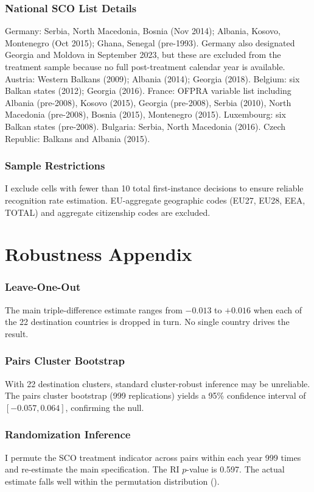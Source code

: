 \documentclass[12pt]{article}
\begin{document}
\subsubsection*{National SCO List Details} Germany: Serbia, North Macedonia, Bosnia (Nov 2014); Albania, Kosovo, Montenegro (Oct 2015); Ghana, Senegal (pre-1993). Germany also designated Georgia and Moldova in September 2023, but these are excluded from the treatment sample because no full post-treatment calendar year is available. Austria: Western Balkans (2009); Albania (2014); Georgia (2018). Belgium: six Balkan states (2012); Georgia (2016). France: OFPRA variable list including Albania (pre-2008), Kosovo (2015), Georgia (pre-2008), Serbia (2010), North Macedonia (pre-2008), Bosnia (2015), Montenegro (2015). Luxembourg: six Balkan states (pre-2008). Bulgaria: Serbia, North Macedonia (2016). Czech Republic: Balkans and Albania (2015).

\subsubsection*{Sample Restrictions} I exclude cells with fewer than 10 total first-instance decisions to ensure reliable recognition rate estimation. EU-aggregate geographic codes (EU27, EU28, EEA, TOTAL) and aggregate citizenship codes are excluded.

\section{Robustness Appendix}

\subsubsection*{Leave-One-Out} The main triple-difference estimate ranges from $-0.013$ to $+0.016$ when each of the 22 destination countries is dropped in turn. No single country drives the result.

\subsubsection*{Pairs Cluster Bootstrap} With 22 destination clusters, standard cluster-robust inference may be unreliable. The pairs cluster bootstrap (999 replications) yields a 95\% confidence interval of $[-0.057, 0.064]$, confirming the null.

\subsubsection*{Randomization Inference} I permute the SCO treatment indicator across pairs within each year 999 times and re-estimate the main specification. The RI $p$-value is 0.597. The actual estimate falls well within the permutation distribution ().
\end{document}
